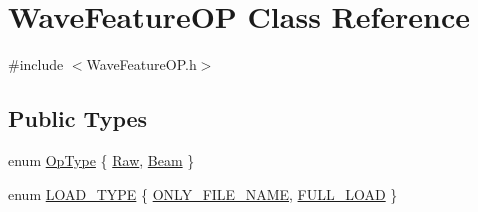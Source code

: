 \hypertarget{class_wave_feature_o_p}{\section{Wave\+Feature\+O\+P Class Reference}
\label{class_wave_feature_o_p}
}


{\ttfamily \#include $<$Wave\+Feature\+O\+P.\+h$>$}

\subsection*{Public Types}
\begin{DoxyCompactItemize}
\item 
enum \hyperlink{class_wave_feature_o_p_a9c2fd724a37768ed03dc5b011d257500}{Op\+Type} \{ \hyperlink{class_wave_feature_o_p_a9c2fd724a37768ed03dc5b011d257500a60db933490e2134e59c4c2e1fb30ea66}{Raw}, 
\hyperlink{class_wave_feature_o_p_a9c2fd724a37768ed03dc5b011d257500a2aede4353c0fdb16edbc21db4085191e}{Beam}
 \}
\item 
enum \hyperlink{class_wave_feature_o_p_abd93c85d1ed5fbc148d41b7f32fc1d84}{L\+O\+A\+D\+\_\+\+T\+Y\+P\+E} \{ \hyperlink{class_wave_feature_o_p_abd93c85d1ed5fbc148d41b7f32fc1d84a56cb938408d6c1cfc350438fe83bb1a0}{O\+N\+L\+Y\+\_\+\+F\+I\+L\+E\+\_\+\+N\+A\+M\+E}, 
\hyperlink{class_wave_feature_o_p_abd93c85d1ed5fbc148d41b7f32fc1d84a1b64a07dfde0c2d4132bc343f4475856}{F\+U\+L\+L\+\_\+\+L\+O\+A\+D}
 \}
\end{DoxyCompactItemize}
